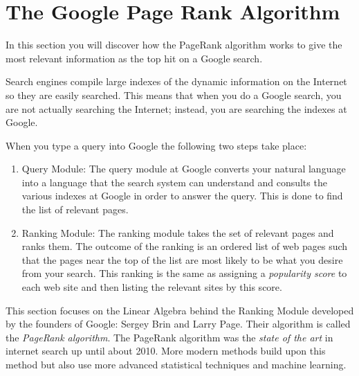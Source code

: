 % 



\newpage\section{The Google Page Rank Algorithm}
In this section you will discover how the PageRank algorithm works to give the most relevant
information as the top hit on a Google search.  

Search engines compile large indexes of the dynamic information on the Internet so they
are easily searched.  This means that when you do a Google search, you are not actually
searching the Internet; instead, you are searching the indexes at Google.

When you type a query into Google the following two steps take place:
\begin{enumerate}
    \item Query Module: The query module at Google converts your natural language into a
        language that the search system can understand and consults the various indexes
        at Google in order to answer the query.  This is done to find the list of relevant
        pages.
    \item Ranking Module: The ranking module takes the set of relevant pages and ranks
        them. The outcome of the ranking is an ordered list of web pages such
        that the pages near the top of the list are most likely to be what you desire from
        your search. This ranking is the same as assigning a {\it popularity score} to
        each web site and then listing the relevant sites by this score.  
\end{enumerate}

This section focuses on the Linear Algebra behind the Ranking Module developed by the
founders of Google: Sergey Brin and Larry Page.  Their algorithm is called the
\emph{PageRank algorithm}. The PageRank algorithm was
the {\it state of the art} in internet search up until about 2010.  More modern methods
build upon this method but also use more advanced statistical techniques and machine
learning.


